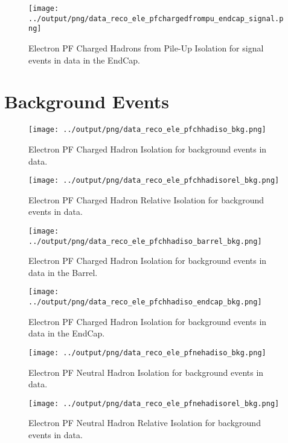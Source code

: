 \documentclass[11pt]{book}
\begin{document}
\begin{figure}[htb]
\centering
\texttt{[image: ../output/png/data\_reco\_ele\_pfchargedfrompu\_endcap\_signal.png]}
\caption{Electron PF Charged Hadrons from Pile-Up Isolation for signal events in data in the EndCap.}
\label{fig:data_ele_pfchargedfrompu_endcap_signal}
\end{figure}


\clearpage

\section{Background Events}

\begin{figure}[htb]
\centering
\texttt{[image: ../output/png/data\_reco\_ele\_pfchhadiso\_bkg.png]}
\caption{Electron PF Charged Hadron Isolation for background events in data.}
\label{fig:data_ele_pfchhadiso_bkg}
\end{figure}

\begin{figure}[htb]
\centering
\texttt{[image: ../output/png/data\_reco\_ele\_pfchhadisorel\_bkg.png]}
\caption{Electron PF Charged Hadron Relative Isolation for background events in data.}
\label{fig:data_ele_pfchhadisorel_bkg}
\end{figure}

\begin{figure}[htb]
\centering
\texttt{[image: ../output/png/data\_reco\_ele\_pfchhadiso\_barrel\_bkg.png]}
\caption{Electron PF Charged Hadron Isolation for background events in data in the Barrel.}
\label{fig:data_ele_pfchhadiso_barrel_bkg}
\end{figure}

\begin{figure}[htb]
\centering
\texttt{[image: ../output/png/data\_reco\_ele\_pfchhadiso\_endcap\_bkg.png]}
\caption{Electron PF Charged Hadron Isolation for background events in data in the EndCap.}
\label{fig:data_ele_pfchhadiso_endcap_bkg}
\end{figure}

\begin{figure}[htb]
\centering
\texttt{[image: ../output/png/data\_reco\_ele\_pfnehadiso\_bkg.png]}
\caption{Electron PF Neutral Hadron Isolation for background events in data.}
\label{fig:data_ele_pfnehadiso_bkg}
\end{figure}

\begin{figure}[htb]
\centering
\texttt{[image: ../output/png/data\_reco\_ele\_pfnehadisorel\_bkg.png]}
\caption{Electron PF Neutral Hadron Relative Isolation for background events in data.}
\label{fig:data_ele_pfnehadisorel_bkg}
\end{figure}
\end{document}
